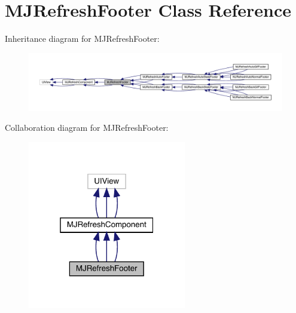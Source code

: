 \hypertarget{interface_m_j_refresh_footer}{}\section{M\+J\+Refresh\+Footer Class Reference}
\label{interface_m_j_refresh_footer}


Inheritance diagram for M\+J\+Refresh\+Footer\+:\nopagebreak
\begin{figure}[H]
\begin{center}
\leavevmode
\includegraphics[width=350pt]{interface_m_j_refresh_footer__inherit__graph}
\end{center}
\end{figure}


Collaboration diagram for M\+J\+Refresh\+Footer\+:\nopagebreak
\begin{figure}[H]
\begin{center}
\leavevmode
\includegraphics[width=196pt]{interface_m_j_refresh_footer__coll__graph}
\end{center}
\end{figure}
